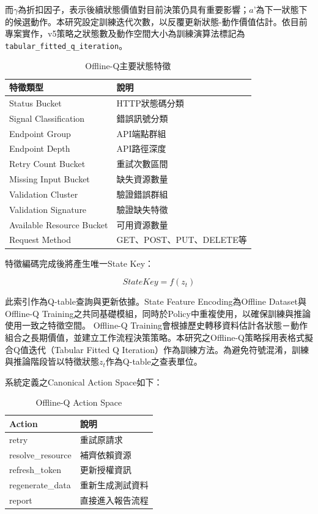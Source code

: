 \begin{ZhChapter}
\text 而$\gamma$為折扣因子，表示後續狀態價值對目前決策仍具有重要影響；$a’$為下一狀態下的候選動作。本研究設定訓練迭代次數，以反覆更新狀態-動作價值估計。依目前專案實作，v5策略之狀態數及動作空間大小為訓練演算法標記為\texttt{tabular\_fitted\_q\_iteration}。
\begin{table}[H]
\centering
\caption{Offline-Q主要狀態特徵}
\label{tab:offline_state_features}
\renewcommand{\arraystretch}{1.3}
\begin{tabular}{p{5cm} p{8cm}}
\toprule
特徵類型 & 說明 \\
\midrule
Status Bucket & HTTP狀態碼分類 \\
Signal Classification & 錯誤訊號分類 \\
Endpoint Group & API端點群組 \\
Endpoint Depth & API路徑深度 \\
Retry Count Bucket & 重試次數區間 \\
Missing Input Bucket & 缺失資源數量 \\
Validation Cluster & 驗證錯誤群組 \\
Validation Signature & 驗證缺失特徵 \\
Available Resource Bucket & 可用資源數量 \\
Request Method & GET、POST、PUT、DELETE等 \\
\bottomrule
\end{tabular}
\end{table}

\text 特徵編碼完成後將產生唯一State Key：

\begin{equation}
\label{eq:state_key_definition}
StateKey = f(z_t)
\end{equation}

\text 此索引作為Q-table查詢與更新依據。State Feature Encoding為Offline Dataset與Offline-Q Training之共同基礎模組，同時於Policy中重複使用，以確保訓練與推論使用一致之特徵空間。
\text Offline-Q Training會根據歷史轉移資料估計各狀態－動作組合之長期價值，並建立工作流程決策策略。本研究之Offline-Q策略採用表格式擬合Q值迭代（Tabular Fitted Q Iteration）作為訓練方法。為避免符號混淆，訓練與推論階段皆以特徵狀態$z_t$作為Q-table之查表單位。

\text 系統定義之Canonical Action Space如下：

\begin{table}[H]
\centering
\caption{Offline-Q Action Space}
\label{tab:offline_q_actions}
\renewcommand{\arraystretch}{1.3}
\begin{tabular}{p{4cm} p{9cm}}
\toprule
Action & 說明 \\
\midrule
retry & 重試原請求 \\
resolve\_resource & 補齊依賴資源 \\
refresh\_token & 更新授權資訊 \\
regenerate\_data & 重新生成測試資料 \\
report & 直接進入報告流程 \\
\bottomrule
\end{tabular}
\end{table}


\end{ZhChapter}
